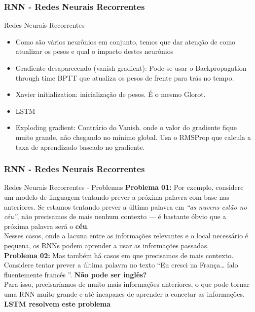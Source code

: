 \documentclass{beamer}
\begin{document}
\begin{frame}
	\frametitle{RNN - Redes Neurais Recorrentes}
	\begin{block}{Redes Neurais Recorrentes}
		\begin{itemize}
			\item Como são vários neurônios em conjunto, temos que dar atenção de como atualizar os pesos e qual o impacto destes neurônios
			\item Gradiente desaparecendo (vanish gradient): Pode-se usar o Backpropagation through time BPTT que atualiza os pesos de frente para trás no tempo.
			\item Xavier initialization: inicialização de pesos. É o mesmo Glorot.
			\item LSTM
			\item Exploding gradient: Contrário do Vanish. onde o valor do gradiente fique muito grande, não chegando no mínimo global. Usa o RMSProp que calcula a taxa de aprendizado baseado no gradiente.
		\end{itemize}
		
	\end{block}
\end{frame}
\begin{frame}
	\frametitle{RNN - Redes Neurais Recorrentes}
	\begin{block}{Redes Neurais Recorrentes - Problemas}
		\textbf{Problema 01:} Por exemplo, considere um modelo de linguagem tentando prever a próxima palavra com base nas anteriores. Se estamos tentando prever a última palavra em \textit{``as nuvens estão no \textit{céu}''}, não precisamos de mais nenhum contexto — é bastante óbvio que a próxima palavra será o \textbf{céu}. \\
		Nesses casos, onde a lacuna entre as informações relevantes e o local necessário é pequena, os RNNs podem aprender a usar as informações passadas. \\
		\textbf{Problema 02:} Mas também há casos em que precisamos de mais contexto. Considere tentar prever a última palavra no texto ``Eu cresci na França… falo fluentemente francês ''. \textbf{Não pode ser inglês?} \\
		Para isso, precisaríamos de muito mais informações anteriores, o que pode tornar uma RNN muito grande e até incapazes de aprender a conectar as informações. \\
		\textbf{LSTM resolvem este problema}
		
	\end{block}
\end{frame}
\end{document}
